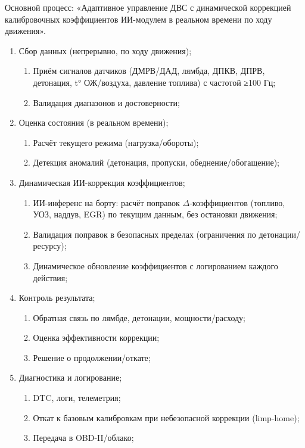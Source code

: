 \documentclass[14pt, a4paper]{extarticle}
\begin{document}
			Основной процесс: «Адаптивное управление ДВС с динамической коррекцией калибровочных коэффициентов ИИ-модулем в реальном времени по ходу движения».
		
		\begin{enumerate}
			\item Сбор данных (непрерывно, по ходу движения);
			\begin{enumerate}
				\item Приём сигналов датчиков (ДМРВ/ДАД, лямбда, ДПКВ, ДПРВ, детонация, t° ОЖ/воздуха, давление топлива) с частотой ≥100 Гц;
				\item Валидация диапазонов и достоверности;
			\end{enumerate}
			
			\item Оценка состояния (в реальном времени);
			\begin{enumerate}
				\item Расчёт текущего режима (нагрузка/обороты);
				\item Детекция аномалий (детонация, пропуски, обеднение/обогащение);
			\end{enumerate}
			
			\item Динамическая ИИ-коррекция коэффициентов;
			\begin{enumerate}
				\item ИИ-инференс на борту: расчёт поправок $\Delta$-коэффициентов (топливо, УОЗ, наддув, EGR) по текущим данным, без остановки движения;
				\item Валидация поправок в безопасных пределах (ограничения по детонации/ресурсу);
				\item Динамическое обновление коэффициентов с логированием каждого действия;
			\end{enumerate}
			
			\item Контроль результата;
			\begin{enumerate}
				\item Обратная связь по лямбде, детонации, мощности/расходу;
				\item Оценка эффективности коррекции;
				\item Решение о продолжении/откате;
			\end{enumerate}
			
			\item Диагностика и логирование;
			\begin{enumerate}
				\item DTC, логи, телеметрия;
				\item Откат к базовым калибровкам при небезопасной коррекции (limp-home);
				\item Передача в OBD-II/облако;
			\end{enumerate}
		\end{enumerate}
		
\end{document}
